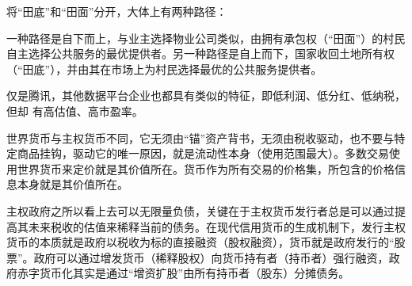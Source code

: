 将“田底”和“田面”分开，大体上有两种路径：

一种路径是自下而上，与业主选择物业公司类似，由拥有承包权（“田面”）的村民自主选择公共服务的最优提供者。另一种路径是自上而下，国家收回土地所有权（“田底”），并由其在市场上为村民选择最优的公共服务提供者。

仅是腾讯，其他数据平台企业也都具有类似的特征，即低利润、低分红、低纳税，但却
有高估值、高市盈率。

世界货币与主权货币不同，它无须由“锚”资产背书，无须由税收驱动，也不要与特定商品挂钩，驱动它的唯一原因，就是流动性本身（使用范围最大）。多数交易使用世界货币来定价就是其价值所在。货币作为所有交易的价格集，所包含的价格信息本身就是其价值所在。

主权政府之所以看上去可以无限量负债，关键在于主权货币发行者总是可以通过提高其未来税收的估值来稀释当前的债务。在现代信用货币的生成机制下，发行主权货币的本质就是政府以税收为标的直接融资（股权融资），货币就是政府发行的“股票”。政府可以通过增发货币（稀释股权）向货币持有者（持币者）强行融资，政府赤字货币化其实是通过“增资扩股”由所有持币者（股东）分摊债务。




